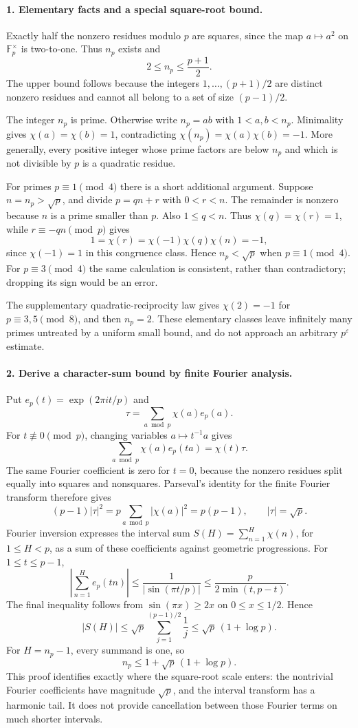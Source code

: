 \documentclass[11pt]{article}
\begin{document}
\paragraph{1. Elementary facts and a special square-root bound.}
Exactly half the nonzero residues modulo $p$ are squares, since the map $a\mapsto a^2$ on $\mathbb F_p^\times$ is two-to-one. Thus $n_p$ exists and
\[
 2\le n_p\le\frac{p+1}{2}.
\]
The upper bound follows because the integers $1,\ldots,(p+1)/2$ are distinct nonzero residues and cannot all belong to a set of size $(p-1)/2$.

The integer $n_p$ is prime. Otherwise write $n_p=ab$ with $1<a,b<n_p$. Minimality gives $\chi(a)=\chi(b)=1$, contradicting $\chi(n_p)=\chi(a)\chi(b)=-1$. More generally, every positive integer whose prime factors are below $n_p$ and which is not divisible by $p$ is a quadratic residue.

For primes $p\equiv1\pmod4$ there is a short additional argument. Suppose $n=n_p>\sqrt p$, and divide $p=qn+r$ with $0<r<n$. The remainder is nonzero because $n$ is a prime smaller than $p$. Also $1\le q<n$. Thus $\chi(q)=\chi(r)=1$, while $r\equiv-qn\pmod p$ gives
\[
 1=\chi(r)=\chi(-1)\chi(q)\chi(n)=-1,
\]
since $\chi(-1)=1$ in this congruence class. Hence $n_p<\sqrt p$ when $p\equiv1\pmod4$. For $p\equiv3\pmod4$ the same calculation is consistent, rather than contradictory; dropping its sign would be an error.

The supplementary quadratic-reciprocity law gives $\chi(2)=-1$ for $p\equiv3,5\pmod8$, and then $n_p=2$. These elementary classes leave infinitely many primes untreated by a uniform small bound, and do not approach an arbitrary $p^\varepsilon$ estimate.

\paragraph{2. Derive a character-sum bound by finite Fourier analysis.}
Put $e_p(t)=\exp(2\pi it/p)$ and
\[
 \tau=\sum_{a\bmod p}\chi(a)e_p(a).
\]
For $t\not\equiv0\pmod p$, changing variables $a\mapsto t^{-1}a$ gives
\[
 \sum_{a\bmod p}\chi(a)e_p(ta)=\chi(t)\tau.
\]
The same Fourier coefficient is zero for $t=0$, because the nonzero residues split equally into squares and nonsquares. Parseval's identity for the finite Fourier transform therefore gives
\[
 (p-1)|\tau|^2
 =p\sum_{a\bmod p}|\chi(a)|^2=p(p-1),
 \qquad |\tau|=\sqrt p.
\]
Fourier inversion expresses the interval sum $S(H)=\sum_{n=1}^{H}\chi(n)$, for $1\le H<p$, as a sum of these coefficients against geometric progressions. For $1\le t\le p-1$,
\[
 \left|\sum_{n=1}^{H}e_p(tn)\right|
 \le\frac1{|\sin(\pi t/p)|}
 \le\frac{p}{2\min(t,p-t)}.
\]
The final inequality follows from $\sin(\pi x)\ge2x$ on $0\le x\le1/2$. Hence
\[
 |S(H)|\le\sqrt p\sum_{j=1}^{(p-1)/2}\frac1j
 \le\sqrt p\,(1+\log p).
\]
For $H=n_p-1$, every summand is one, so
\[
 n_p\le1+\sqrt p\,(1+\log p).
\]
This proof identifies exactly where the square-root scale enters: the nontrivial Fourier coefficients have magnitude $\sqrt p$, and the interval transform has a harmonic tail. It does not provide cancellation between those Fourier terms on much shorter intervals.
\end{document}
